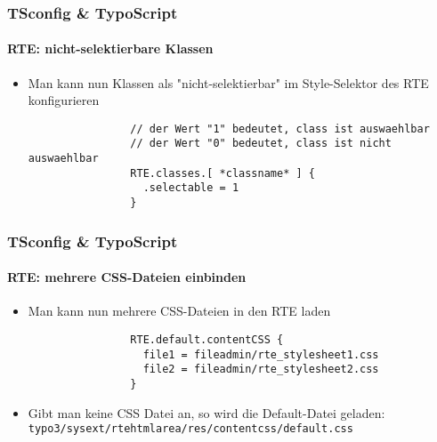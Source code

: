 \begin{frame}[fragile]
	\frametitle{TSconfig \& TypoScript}
	\framesubtitle{RTE: nicht-selektierbare Klassen}

	\begin{itemize}
		\item Man kann nun Klassen als "nicht-selektierbar" im Style-Selektor des RTE konfigurieren

			\begin{lstlisting}
				// der Wert "1" bedeutet, class ist auswaehlbar
				// der Wert "0" bedeutet, class ist nicht auswaehlbar
				RTE.classes.[ *classname* ] {
				  .selectable = 1
				}
			\end{lstlisting}

	\end{itemize}

\end{frame}


\begin{frame}[fragile]
	\frametitle{TSconfig \& TypoScript}
	\framesubtitle{RTE: mehrere CSS-Dateien einbinden}

	\begin{itemize}
		\item Man kann nun mehrere CSS-Dateien in den RTE laden

			\begin{lstlisting}
				RTE.default.contentCSS {
				  file1 = fileadmin/rte_stylesheet1.css
				  file2 = fileadmin/rte_stylesheet2.css
				}
			\end{lstlisting}

		\item Gibt man keine CSS Datei an, so wird die Default-Datei geladen:\newline
			\texttt{typo3/sysext/rtehtmlarea/res/contentcss/default.css}
	\end{itemize}

\end{frame}


